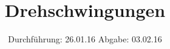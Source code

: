 

\subject{Versuch 102}
\title{Drehschwingungen}
\date{
  Durchführung: 26.01.16
  \hspace{3em}
  Abgabe: 03.02.16
}



\maketitle
\thispagestyle{empty}
\tableofcontents
\newpage






\printbibliography


